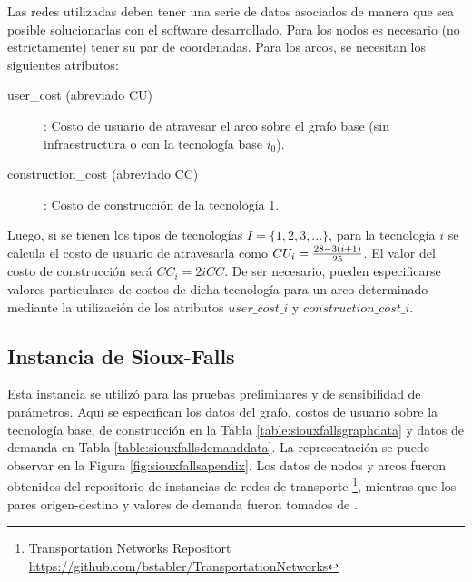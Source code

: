 \documentclass{article}
\begin{document}
  Las redes utilizadas deben tener una serie de datos asociados de manera que sea posible solucionarlas con el software desarrollado. Para los nodos es necesario (no estrictamente) tener su par de coordenadas. Para los arcos, se necesitan los siguientes atributos:

  \begin{description}
    \item[user\_cost (abreviado CU)]: Costo de usuario de atravesar el arco sobre el grafo base (sin infraestructura o con la tecnología base $i_0$).
    \item[construction\_cost (abreviado CC)]: Costo de construcción de la tecnología 1.
  \end{description}

  Luego, si se tienen los tipos de tecnologías $I = \{1, 2, 3, ... \}$, para la tecnología $i$ se calcula el costo de usuario de atravesarla como $CU_i = {28 - 3 (i + 1) \over 25}$. El valor del costo de construcción será $CC_i = 2i CC$. De ser necesario, pueden especificarse valores particulares de costos de dicha tecnología para un arco determinado mediante la utilización de los atributos $user\_cost\_i$ y $construction\_cost\_i$.

  \subsection{Instancia de Sioux-Falls}
  \label{sect:siouxfallsdata}

  Esta instancia se utilizó para las pruebas preliminares y de sensibilidad de parámetros. Aquí se especifican los datos del grafo, costos de usuario sobre la tecnología base, de construcción en la Tabla \ref{table:siouxfallsgraphdata} y datos de demanda en Tabla \ref{table:siouxfallsdemanddata}. La representación se puede observar en la Figura \ref{fig:siouxfallsapendix}. Los datos de nodos y arcos fueron obtenidos del repositorio de instancias de redes de transporte \footnote{Transportation Networks Repositort \url{https://github.com/bstabler/TransportationNetworks}}, mientras que los pares origen-destino y valores de demanda fueron tomados de \cite{liu2019}.
\end{document}
